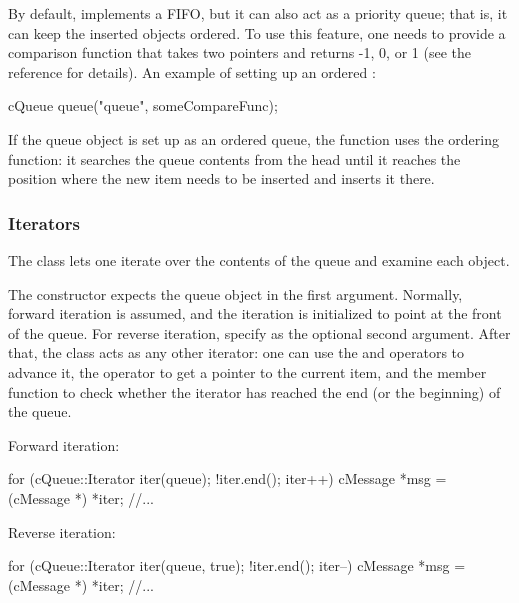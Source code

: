 By default,  implements a FIFO, but it can also act as a
priority queue; that is, it can keep the inserted objects
ordered. To use this feature, one needs to provide a
comparison function that takes two  pointers and returns
-1, 0, or 1 (see the reference for details). An example of setting up an
ordered :

\begin{cpp}
cQueue queue("queue", someCompareFunc);
\end{cpp}

If the queue object is set up as an ordered queue, the 
function uses the ordering function: it searches the queue contents
from the head until it reaches the position where the new item
needs to be inserted and inserts it there.


\subsubsection{Iterators}
\label{sec:sim-lib:cqueue-iteration}

The  class lets one iterate over the contents
of the queue and examine each object.

The  constructor expects the queue object in the
first argument. Normally, forward iteration is assumed, and the iteration
is initialized to point at the front of the queue. For reverse iteration,
specify  as the optional second argument. After that, the
class acts as any other {\opp} iterator: one can use the \ttt{++} and
\ttt{--} operators to advance it, the \ttt{*} operator to get a pointer
to the current item, and the  member function to check
whether the iterator has reached the end (or the beginning) of the queue.

Forward iteration:

\begin{cpp}
for (cQueue::Iterator iter(queue); !iter.end(); iter++) {
    cMessage *msg = (cMessage *) *iter;
    //...
}
\end{cpp}

Reverse iteration:

\begin{cpp}
for (cQueue::Iterator iter(queue, true); !iter.end(); iter--) {
    cMessage *msg = (cMessage *) *iter;
    //...
}
\end{cpp}



